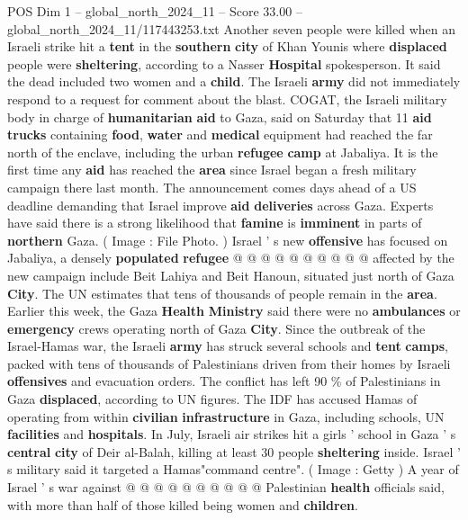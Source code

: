 \begin{textsample}{POS Dim 1 – global\_north\_2024\_11 – Score 33.00 – global\_north\_2024\_11/117443253.txt}  \label{ex:f1_pos_340}
Another seven people were killed when an Israeli strike hit a \textbf{tent} in the \textbf{southern} \textbf{city} of Khan Younis where \textbf{displaced} people were \textbf{sheltering}, according to a Nasser \textbf{Hospital} spokesperson.
It said the dead included two women and a \textbf{child}.
The Israeli \textbf{army} did not immediately respond to a request for comment about the blast.
COGAT, the Israeli military body in charge of \textbf{humanitarian} \textbf{aid} to Gaza, said on Saturday that 11 \textbf{aid} \textbf{trucks} containing \textbf{food}, \textbf{water} and \textbf{medical} equipment had reached the far north of the enclave, including the urban \textbf{refugee} \textbf{camp} at Jabaliya.
It is the first time any \textbf{aid} has reached the \textbf{area} since Israel began a fresh military campaign there last month.
The announcement comes days ahead of a US deadline demanding that Israel improve \textbf{aid} \textbf{deliveries} across Gaza.
Experts have said there is a strong likelihood that \textbf{famine} is \textbf{imminent} in parts of \textbf{northern} Gaza. ( Image : File Photo. ) Israel ' s new \textbf{offensive} has focused on Jabaliya, a densely \textbf{populated} \textbf{refugee} @ @ @ @ @ @ @ @ @ @ affected by the new campaign include Beit Lahiya and Beit Hanoun, situated just north of Gaza \textbf{City}.
The UN estimates that tens of thousands of people remain in the \textbf{area}.
Earlier this week, the Gaza \textbf{Health} \textbf{Ministry} said there were no \textbf{ambulances} or \textbf{emergency} crews operating north of Gaza \textbf{City}.
Since the outbreak of the Israel-Hamas war, the Israeli \textbf{army} has struck several schools and \textbf{tent} \textbf{camps}, packed with tens of thousands of Palestinians driven from their homes by Israeli \textbf{offensives} and evacuation orders.
The conflict has left 90 \% of Palestinians in Gaza \textbf{displaced}, according to UN figures.
The IDF has accused Hamas of operating from within \textbf{civilian} \textbf{infrastructure} in Gaza, including schools, UN \textbf{facilities} and \textbf{hospitals}.
In July, Israeli air strikes hit a girls ' school in Gaza ' s \textbf{central} \textbf{city} of Deir al-Balah, killing at least 30 people \textbf{sheltering} inside.
Israel ' s military said it targeted a Hamas"command centre". ( Image : Getty ) A year of Israel ' s war against @ @ @ @ @ @ @ @ @ @ Palestinian \textbf{health} officials said, with more than half of those killed being women and \textbf{children}.

\end{textsample}

